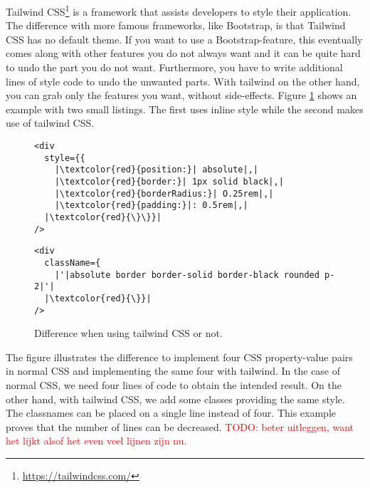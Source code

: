 Tailwind CSS\footnote{\url{https://tailwindcss.com/}} is a framework that assists developers to style their application. The difference with more famous frameworks, like Bootstrap, is that Tailwind CSS has no default theme. If you want to use a Bootstrap-feature, this eventually comes along with other features you do not always want and it can be quite hard to undo the part you do not want. Furthermore, you have to write additional lines of style code to undo the unwanted parts. With tailwind on the other hand, you can grab only the features you want, without side-effects. Figure \ref{fig:examplecode-tailwindcss} shows an example with two small listings. The first uses inline style while the second makes use of tailwind CSS.

\begin{figure}[H]
	\begin{minipage}[b]{0.5\textwidth}
 		\centering
  		\begin{verbatim}
<div
  style={{
    |\textcolor{red}{position:}| absolute|,|
    |\textcolor{red}{border:}| 1px solid black|,|
    |\textcolor{red}{borderRadius:}| O.25rem|,|
    |\textcolor{red}{padding:}|: 0.5rem|,|
  |\textcolor{red}{\}\}}|
/>
		\end{verbatim}
		\label{lst:no-tailwind}
	\end{minipage}
 	\begin{minipage}[b]{0.5\textwidth}
  		\centering
		\begin{verbatim}
<div
  className={
    |'|absolute border border-solid border-black rounded p-2|'|
  |\textcolor{red}{\}}|
/>
		\end{verbatim}
		\label{lst:tailwind}
 	\end{minipage}
	\caption{Difference when using tailwind CSS or not.}
	\label{fig:examplecode-tailwindcss}
\end{figure}

The figure illustrates the difference to implement four CSS property-value pairs in normal CSS and implementing the same four with tailwind. In the case of normal CSS, we need four lines of code to obtain the intended result. On the other hand, with tailwind CSS, we add some classes providing the same style. The classnames can be placed on a single line instead of four. This example proves that the number of lines can be decreased. \textcolor{red}{TODO: beter uitleggen, want het lijkt alsof het even veel lijnen zijn nu.}\\

